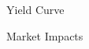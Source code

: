 \documentclass[10pt]{article}
\begin{document}
    \begin{core}{Yield Curve}




    \end{core}

    \begin{core}{Market Impacts}







    \end{core}
\end{document}
